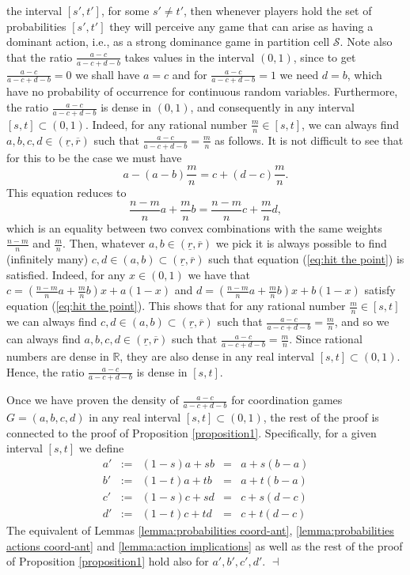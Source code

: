 \documentclass[fleqn,reqno,12pt]{article}
\theoremstyle{Satz}
\theoremstyle{Bsp}
\begin{document}
the interval $[s',t']$, for some $s'\neq t'$, then whenever players
hold the set of probabilities $[s',t']$ they will perceive any game
that can arise as having a dominant action, i.e., as a strong dominance
game in partition cell $\mathcal{S}$. Note also that the ratio $\frac{a-c}{a-c+d-b}$
takes values in the interval $(0,1)$, since to get $\frac{a-c}{a-c+d-b}=0$
we shall have $a=c$ and for $\frac{a-c}{a-c+d-b}=1$ we need $d=b$,
which have no probability of occurrence for continuous random variables.
Furthermore, the ratio $\frac{a-c}{a-c+d-b}$ is dense in $(0,1)$,
and consequently in any interval $[s,t]\subset(0,1)$. Indeed, for
any rational number $\frac{m}{n}\in[s,t]$, we can always find $a,b,c,d\in(\underline{r},\overline{r})$
such that $\frac{a-c}{a-c+d-b}=\frac{m}{n}$ as follows. It is not
difficult to see that for this to be the case we must have 
\[
a-(a-b)\frac{m}{n}=c+(d-c)\frac{m}{n}.
\]
This equation reduces to
\begin{equation}
\frac{n-m}{n}a+\frac{m}{n}b=\frac{n-m}{n}c+\frac{m}{n}d,\label{eq:hit the point}
\end{equation}
which is an equality between two convex combinations with the same
weights $\frac{n-m}{n}$ and $\frac{m}{n}$. Then, whatever $a,b\in(\underline{r},\overline{r})$
we pick it is always possible to find (infinitely many) $c,d\in(a,b)\subset(\underline{r},\overline{r})$
such that equation (\ref{eq:hit the point}) is satisfied. Indeed,
for any $x\in(0,1)$ we have that $c=(\frac{n-m}{n}a+\frac{m}{n}b)x+a(1-x)$
and $d=(\frac{n-m}{n}a+\frac{m}{n}b)x+b(1-x)$ satisfy equation (\ref{eq:hit the point}).
This shows that for any rational number $\frac{m}{n}\in[s,t]$ we
can always find $c,d\in(a,b)\subset(\underline{r},\overline{r})$
such that $\frac{a-c}{a-c+d-b}=\frac{m}{n}$, and so we can always
find $a,b,c,d\in(\underline{r},\overline{r})$ such that $\frac{a-c}{a-c+d-b}=\frac{m}{n}$.
Since rational numbers are dense in $\mathbb{R}$, they are also dense
in any real interval $[s,t]\subset(0,1)$. Hence, the ratio $\frac{a-c}{a-c+d-b}$
is dense in $[s,t]$.

Once we have proven the density of $\frac{a-c}{a-c+d-b}$ for coordination
games $G=(a,b,c,d)$ in any real interval $[s,t]\subset(0,1)$, the
rest of the proof is connected to the proof of Proposition \ref{proposition1}. Specifically,
for a given interval $[s,t]$ we define
\begin{equation}
\begin{array}{ccccc}
a' & := & (1-s)a+sb & = & a+s(b-a)\\
b' & := & (1-t)a+tb & = & a+t(b-a)\\
c' & := & (1-s)c+sd & = & c+s(d-c)\\
d' & := & (1-t)c+td & = & c+t(d-c)
\end{array}\label{eq:a'b'c'd'}
\end{equation}
The equivalent of Lemmas \ref{lemma:probabilities coord-ant}, \ref{lemma:probabilities actions coord-ant} and \ref{lemma:action implications} as well as the rest of the proof of Proposition \ref{proposition1} hold also for $a',b',c',d'$. \hfill $\dashv$



\newpage

\printbibliography[heading=bibintoc]
\end{document}
